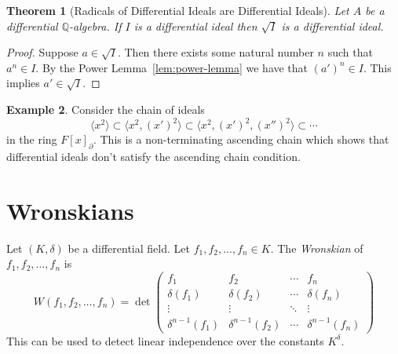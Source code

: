 \documentclass[]{article}
\numberwithin{equation}{section}
\newtheorem{theorem}{Theorem}[subsection]
\theoremstyle{definition}
\newtheorem{example}[theorem]{Example}
\theoremstyle{remark}
\newcommand{\QQ}{\mathbb{Q}}
\begin{document}
\begin{theorem}[Radicals of Differential Ideals are Differential Ideals]
	Let $A$ be a differential $\QQ$-algebra. 
	If $I$ is a differential ideal then $\sqrt{I}$ is a differential ideal. 
\end{theorem}
\begin{proof}
	Suppose $a \in \sqrt{I}$. 
	Then there exists some natural number $n$ such that $a^n \in I$. 
	By the Power Lemma~\ref{lem:power-lemma} we have that $(a')^n \in I$. 
	This implies $a' \in \sqrt{I}$. 
\end{proof}




\begin{example}
	Consider the chain of ideals 
	 $$ \langle x^2 \rangle  \subset \langle x^2, (x')^2 \rangle \subset \langle x^2, (x')^2, (x'')^2 \rangle \subset \cdots $$
	in the ring $F[x]_{\partial}$. 
	This is a non-terminating ascending chain which shows that differential ideals don't satisfy the ascending chain condition.
\end{example}

\section{Wronskians}
Let $(K,\delta)$ be a differential field. 
Let $f_1,f_2,\ldots,f_n\in K$.
The \emph{Wronskian} of $f_1,f_2,\ldots,f_n$ is 
	 $$ W(f_1,f_2,\ldots,f_n) = \det \begin{pmatrix}
	 f_1 & f_2 & \cdots & f_n \\
	 \delta(f_1) & \delta(f_2) & \cdots & \delta(f_n) \\
	 \vdots & \vdots & \ddots & \vdots \\
	 \delta^{n-1}(f_1) & \delta^{n-1}(f_2) & \cdots & \delta^{n-1}(f_n)
	 \end{pmatrix} $$
This can be used to detect linear independence over the constants $K^{\delta}$. 
\end{document}
